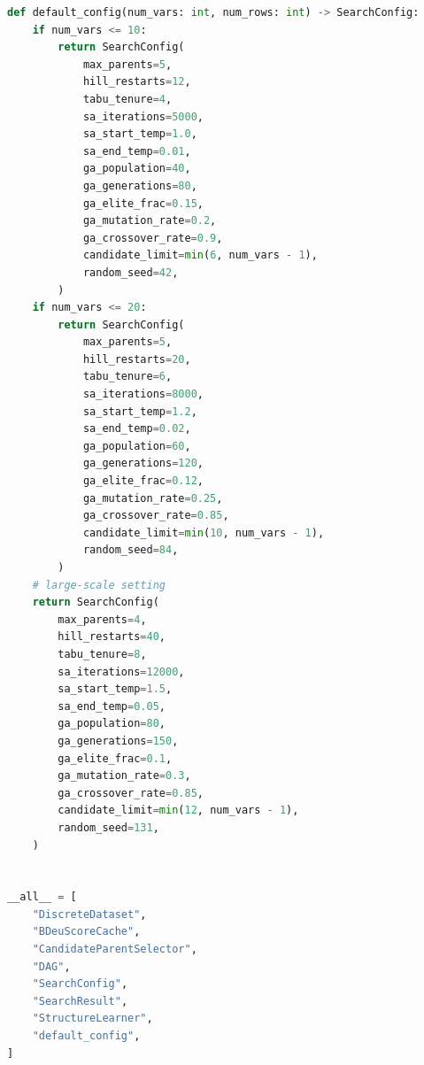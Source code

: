 \documentclass[twoside,11pt]{article}
\begin{document}
\begin{algorithm}
\begin{lstlisting}[language=Python]
def default_config(num_vars: int, num_rows: int) -> SearchConfig:
    if num_vars <= 10:
        return SearchConfig(
            max_parents=5,
            hill_restarts=12,
            tabu_tenure=4,
            sa_iterations=5000,
            sa_start_temp=1.0,
            sa_end_temp=0.01,
            ga_population=40,
            ga_generations=80,
            ga_elite_frac=0.15,
            ga_mutation_rate=0.2,
            ga_crossover_rate=0.9,
            candidate_limit=min(6, num_vars - 1),
            random_seed=42,
        )
    if num_vars <= 20:
        return SearchConfig(
            max_parents=5,
            hill_restarts=20,
            tabu_tenure=6,
            sa_iterations=8000,
            sa_start_temp=1.2,
            sa_end_temp=0.02,
            ga_population=60,
            ga_generations=120,
            ga_elite_frac=0.12,
            ga_mutation_rate=0.25,
            ga_crossover_rate=0.85,
            candidate_limit=min(10, num_vars - 1),
            random_seed=84,
        )
    # large-scale setting
    return SearchConfig(
        max_parents=4,
        hill_restarts=40,
        tabu_tenure=8,
        sa_iterations=12000,
        sa_start_temp=1.5,
        sa_end_temp=0.05,
        ga_population=80,
        ga_generations=150,
        ga_elite_frac=0.1,
        ga_mutation_rate=0.3,
        ga_crossover_rate=0.85,
        candidate_limit=min(12, num_vars - 1),
        random_seed=131,
    )


__all__ = [
    "DiscreteDataset",
    "BDeuScoreCache",
    "CandidateParentSelector",
    "DAG",
    "SearchConfig",
    "SearchResult",
    "StructureLearner",
    "default_config",
]
\end{lstlisting}
\end{algorithm}
\end{document}

